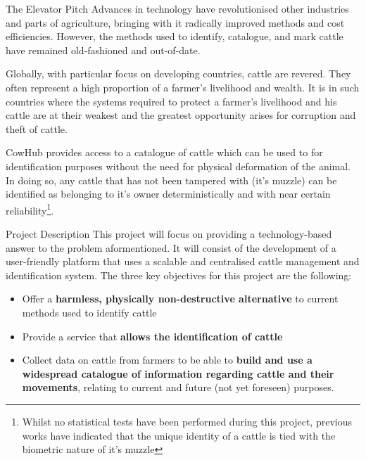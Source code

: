 

\begin{subsection}{The Elevator Pitch}
  Advances in technology have revolutionised other industries and parts of agriculture, bringing with it radically improved methods and cost efficiencies. However, the methods used to identify, catalogue, and mark cattle have remained old-fashioned and out-of-date.

  Globally, with particular focus on developing countries, cattle are revered. They often represent a high proportion of a farmer's livelihood and wealth. It is in such countries where the systems required to protect a farmer's livelihood and his cattle are at their weakest and the greatest opportunity arises for corruption and theft of cattle.

  CowHub provides access to a catalogue of cattle which can be used to for identification purposes without the need for physical deformation of the animal. In doing so, any cattle that has not been tampered with (it's muzzle) can be identified as belonging to it's owner deterministically and with near certain reliability\footnote{Whilst no statistical tests have been performed during this project, previous works have indicated that the unique identity of a cattle is tied with the biometric nature of it's muzzle}.
\end{subsection}


\begin{subsection}{Project Description}
  This project will focus on providing a technology-based answer to the problem aformentioned. It will consist of the development of a user-friendly platform that uses a scalable and centralised cattle management and identification system. The three key objectives for this project are the following:

  \begin{itemize}
  	\item Offer a \textbf{harmless, physically non-destructive alternative} to current methods used to identify cattle
  	\item Provide a service that \textbf{allows the identification of cattle}
  	\item Collect data on cattle from farmers to be able to \textbf{build and use a widespread catalogue of information regarding cattle and their movements}, relating to current and future (not yet foreseen) purposes.
  \end{itemize}

\end{subsection}

